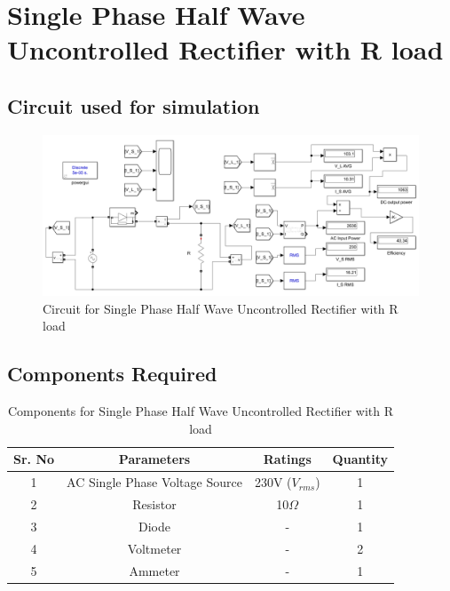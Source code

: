 \section{Single Phase Half Wave Uncontrolled Rectifier with R load}

\subsection{Circuit used for simulation}

\begin{figure}[h]
    \centering
    \includegraphics[width=1.0\textwidth]{images/experiment-1/circuit-diagram-experiment-01.png}
    \caption{Circuit for Single Phase Half Wave Uncontrolled Rectifier with R load}
    \label{Fig_simulation_circuit_single-phase-half-wave-uncontrolled-rectifier-with-R-load}
\end{figure}

\subsection{Components Required}

\begin{table}[h]
    \renewcommand{\arraystretch}{1.3}
    \label{table_components_required_single-phase-half-wave-uncontrolled-rectifier-with-R-load}
    \centering
    \begin{tabular}{|c|c|c|c|}
        \hline
        Sr. No & Parameters                     & Ratings            & Quantity \\
        \hline
        \hline
        1      & AC Single Phase Voltage Source & 230V ($ V_{rms} $) & 1        \\
        \hline
        2      & Resistor                       & 10$ \Omega $       & 1        \\
        \hline
        3      & Diode                          & -                  & 1        \\
        \hline
        4      & Voltmeter                      & -                  & 2        \\
        \hline
        5      & Ammeter                        & -                  & 1        \\
        \hline
    \end{tabular}
    \caption{Components for Single Phase Half Wave Uncontrolled Rectifier with R load}

\end{table}




